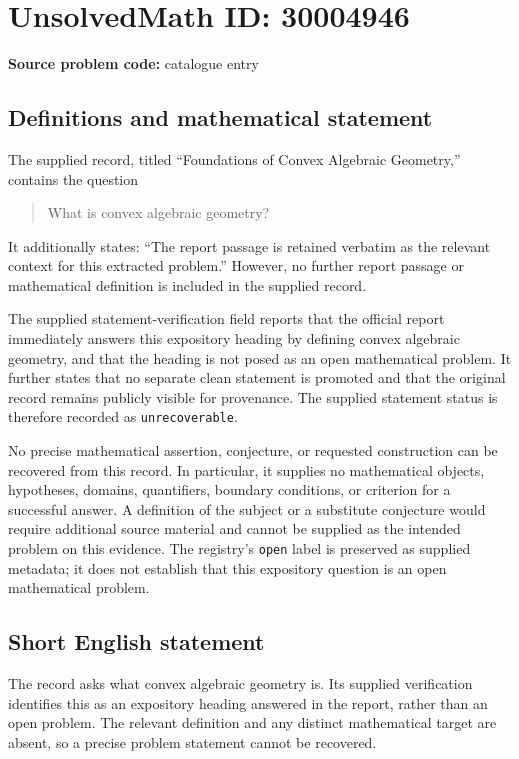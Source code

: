 \documentclass[11pt]{article}
\begin{document}
\section*{UnsolvedMath ID: 30004946}
\textbf{Source problem code:} catalogue entry
\subsection{Definitions and mathematical statement}
The supplied record, titled ``Foundations of Convex Algebraic Geometry,'' contains the question
\begin{quote}
What is convex algebraic geometry?
\end{quote}
It additionally states: ``The report passage is retained verbatim as the relevant context for this extracted problem.'' However, no further report passage or mathematical definition is included in the supplied record.

The supplied statement-verification field reports that the official report immediately answers this expository heading by defining convex algebraic geometry, and that the heading is not posed as an open mathematical problem. It further states that no separate clean statement is promoted and that the original record remains publicly visible for provenance. The supplied statement status is therefore recorded as \texttt{unrecoverable}.

No precise mathematical assertion, conjecture, or requested construction can be recovered from this record. In particular, it supplies no mathematical objects, hypotheses, domains, quantifiers, boundary conditions, or criterion for a successful answer. A definition of the subject or a substitute conjecture would require additional source material and cannot be supplied as the intended problem on this evidence. The registry's \texttt{open} label is preserved as supplied metadata; it does not establish that this expository question is an open mathematical problem.
\subsection{Short English statement}
The record asks what convex algebraic geometry is. Its supplied verification identifies this as an expository heading answered in the report, rather than an open problem. The relevant definition and any distinct mathematical target are absent, so a precise problem statement cannot be recovered.
\end{document}
